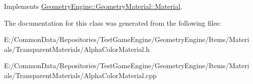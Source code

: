 Implements \mbox{\hyperlink{class_geometry_engine_1_1_geometry_material_1_1_material_a68310797df53062f237d0005fbcfce7e}{Geometry\+Engine\+::\+Geometry\+Material\+::\+Material}}.



The documentation for this class was generated from the following files\+:\begin{DoxyCompactItemize}
\item 
E\+:/\+Common\+Data/\+Repositories/\+Test\+Game\+Engine/\+Geometry\+Engine/\+Items/\+Materials/\+Transparent\+Materials/Alpha\+Color\+Material.\+h\item 
E\+:/\+Common\+Data/\+Repositories/\+Test\+Game\+Engine/\+Geometry\+Engine/\+Items/\+Materials/\+Transparent\+Materials/Alpha\+Color\+Material.\+cpp\end{DoxyCompactItemize}
